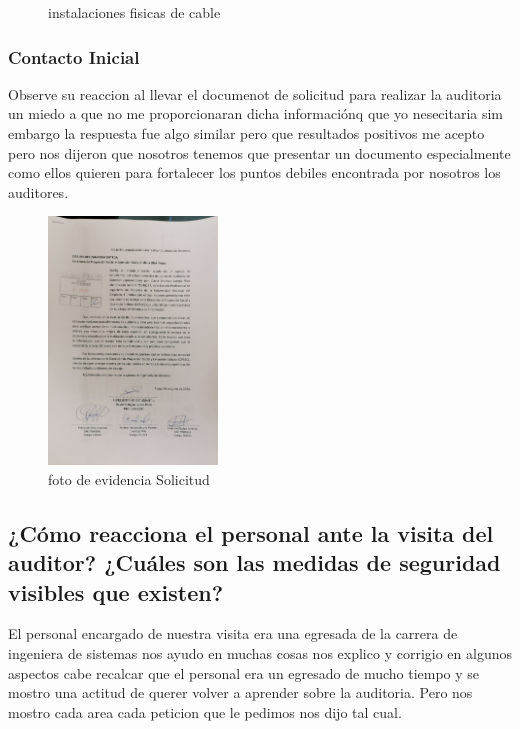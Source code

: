\documentclass[12pt,a4paper]{article}
\begin{document}
\begin{figure}[!htb]
    \centering
    \caption{instalaciones fisicas de cable}
\end{figure}

\newpage
\subsubsection*{Contacto Inicial}
Observe su reaccion al llevar el documenot de solicitud para realizar la auditoria un miedo a que no me proporcionaran dicha informaciónq 
que yo nesecitaria sim embargo la respuesta fue algo similar pero que resultados positivos me acepto pero nos dijeron que nosotros tenemos que presentar un documento 
especialmente como ellos quieren para fortalecer los puntos debiles encontrada por nosotros los auditores.
\begin{figure}[!htb]
    \centering
    \includegraphics[width=0.4\textwidth]{images/solicitud.jpeg}
    \caption{foto de evidencia Solicitud }

\end{figure}

\subsection*{¿Cómo reacciona el personal ante la visita del auditor? ¿Cuáles son las
medidas de seguridad visibles que existen?}
El personal encargado de nuestra visita era una egresada de la carrera de ingeniera de sistemas
nos ayudo en muchas cosas nos explico y corrigio en algunos aspectos cabe recalcar que el personal era
un egresado de mucho tiempo y se mostro una actitud de querer volver a aprender sobre la auditoria.
Pero nos mostro cada area cada peticion que le pedimos nos dijo tal cual.
\end{document}
